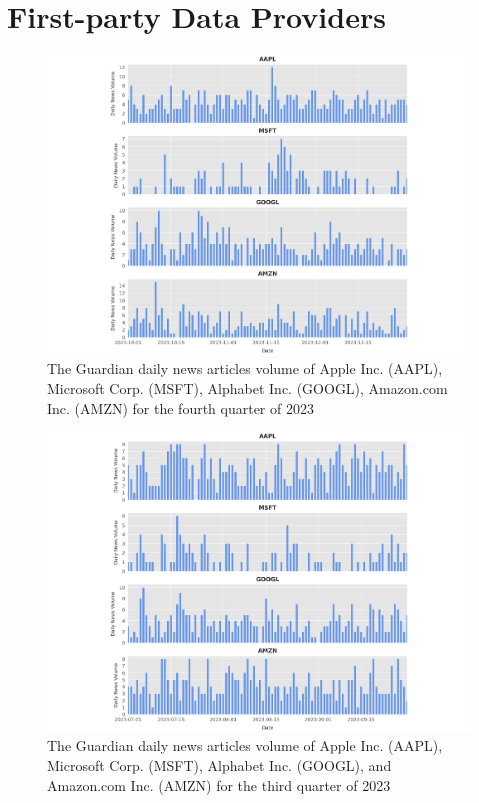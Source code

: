 \newpage

\section{First-party Data Providers}
\label{appsec:first-party-data-providers}

\begin{figure}[htbp]
  \centering
  \includegraphics[width=\textwidth]{img/textual-data/guardian-q4-2023-a.pdf}
  \caption{The Guardian daily news articles volume of Apple Inc. (AAPL), Microsoft Corp. (MSFT), Alphabet Inc. (GOOGL), Amazon.com Inc. (AMZN) for the fourth quarter of 2023}
  \label{fig:guardian-q4-2023}
\end{figure}

\begin{figure}[htbp]
  \centering
  \includegraphics[width=\textwidth]{img/textual-data/guardian-q3-2023-a.pdf}
  \caption{The Guardian daily news articles volume of Apple Inc. (AAPL), Microsoft Corp. (MSFT), Alphabet Inc. (GOOGL), and Amazon.com Inc. (AMZN) for the third quarter of 2023}
  \label{fig:guardian-q3-2023}
\end{figure}

